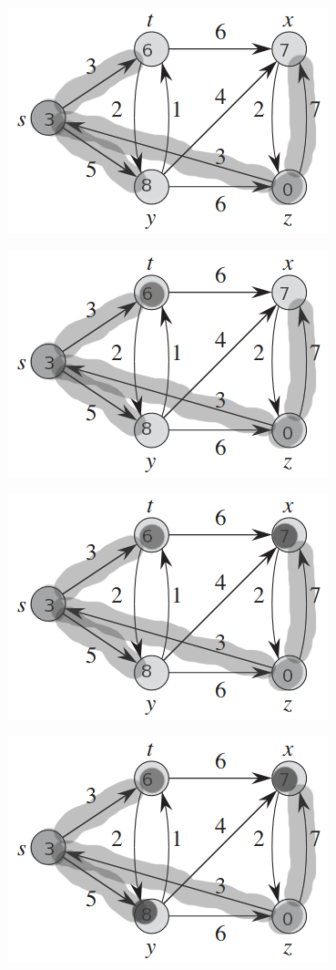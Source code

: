 \documentclass[]{memoir}
\begin{document}
\begin{enumerate}
\begin{figure}[h]
\end{figure}
\begin{figure}[h]
	\centering
	\includegraphics[scale=.7]{z2}
\end{figure}
\begin{figure}[h]
	\centering
	\includegraphics[scale=.7]{z3}
\end{figure}
\begin{figure}[h]
	\centering
	\includegraphics[scale=.7]{z4}
\end{figure}
\begin{figure}[h]
	\centering
	\includegraphics[scale=.7]{z5}
\end{figure}

\end{enumerate}
\end{document}
